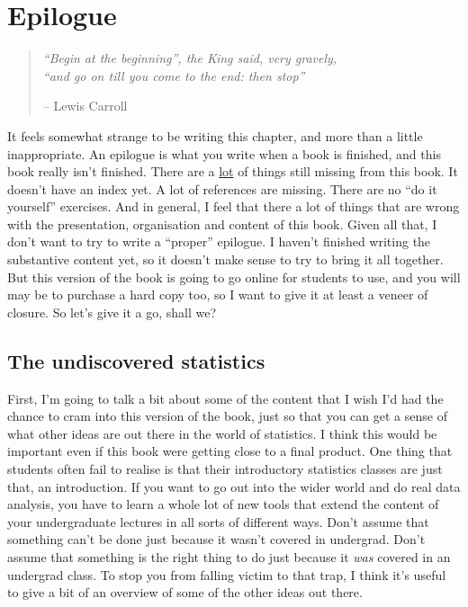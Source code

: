
\chapter{Epilogue}

\begin{quote}
{\it ``Begin at the beginning'', the King said, very gravely, \\``and go on till you come to the end: then stop''} 

\hspace*{2cm} -- Lewis Carroll
\end{quote}


It feels somewhat strange to be writing this chapter, and more than a little inappropriate. An epilogue is what you write when a book is finished, and this book really isn't finished. There are a \underline{lot} of things still missing from this book. It doesn't have an index yet. A lot of references are missing. There are no ``do it yourself'' exercises. And in general, I feel that there a lot of things that are wrong with the presentation, organisation and content of this book. Given all that, I don't want to try to write a ``proper'' epilogue. I haven't finished writing the substantive content yet, so it doesn't make sense to try to bring it all together. But this version of the book is going to go online for students to use, and you will may be to purchase a hard copy too, so I want to give it at least a veneer of closure. So let's give it a go, shall we?


\newcommand{\ITEM}[1]{\item {\bf #1.}}

\section{The undiscovered statistics}

First, I'm going to talk a bit about some of the content that I wish I'd had the chance to cram into this version of the book, just so that you can get a sense of what other ideas are out there in the world of statistics. I think this would be important even if this book were getting close to a final product. One thing that students often fail to realise is that their introductory statistics classes are just that, an introduction. If you want to go out into the wider world and do real data analysis, you have to learn a whole lot of new tools that extend the content of your undergraduate lectures in all sorts of different ways. Don't assume that something can't be done just because it wasn't covered in undergrad. Don't assume that something is the right thing to do just because it {\it was} covered in an undergrad class. To stop you from falling victim to that trap, I think it's useful to give a bit of an overview of some of the other ideas out there. 

